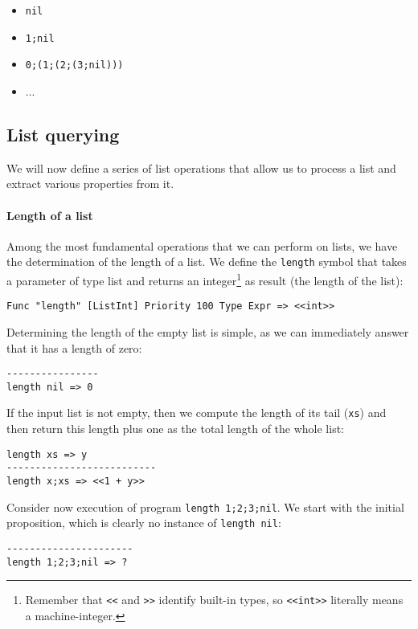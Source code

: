 \begin{itemize}
\item \texttt{nil}
\item \texttt{1;nil}
\item \texttt{0;(1;(2;(3;nil)))}
\item ...
\end{itemize}

\subsection{List querying}
We will now define a series of list operations that allow us to process a list and extract various properties from it.

\paragraph{Length of a list}
Among the most fundamental operations that we can perform on lists, we have the determination of the length of a list. We define the \texttt{length} symbol that takes a parameter of type list and returns an integer\footnote{Remember that \texttt{<<} and \texttt{>>} identify built-in types, so \texttt{<<int>>} literally means a machine-integer.} as result (the length of the list):

\begin{lstlisting}
Func "length" [ListInt] Priority 100 Type Expr => <<int>>
\end{lstlisting}

Determining the length of the empty list is simple, as we can immediately answer that it has a length of zero:

\begin{lstlisting}
----------------
length nil => 0
\end{lstlisting}

If the input list is not empty, then we compute the length of its tail (\texttt{xs}) and then return this length plus one as the total length of the whole list:

\begin{lstlisting}
length xs => y
--------------------------
length x;xs => <<1 + y>>
\end{lstlisting}

Consider now execution of program \texttt{length 1;2;3;nil}. We start with the initial proposition, which is clearly no instance of \texttt{length nil}:

\begin{lstlisting}
----------------------
length 1;2;3;nil => ?
\end{lstlisting}

